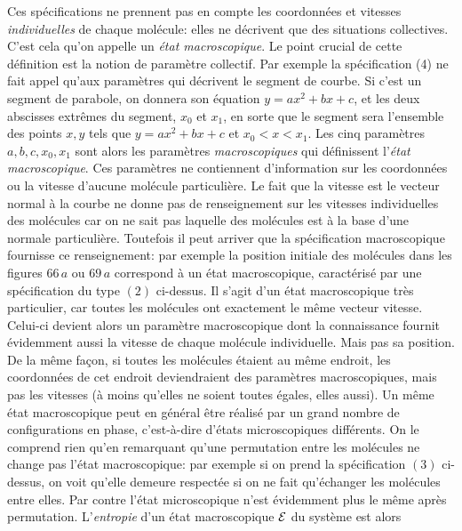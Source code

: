 Ces sp\'ecifications ne prennent pas en compte les coordonn\'ees et 
vitesses {\it individuelles} de chaque mol\'ecule: elles ne d\'ecrivent 
que des situations collectives. C'est cela qu'on appelle un {\it \'etat 
m{\bigsl a\kern0.3pt}croscopique}. Le point crucial de cette d\'efinition 
est la notion de param\`etre collectif.  Par exemple la sp\'ecification (4) 
ne fait appel qu'aux para\-m\`etres qui d\'ecrivent le segment de courbe. 
Si c'est un segment de parabole, on donnera son \'equation 
$y=ax^2 + bx + c$, et les deux abscisses extr\^emes du segment, $x_0$ 
et $x_1$, en sorte que le segment sera l'ensemble des points $x,y$ 
tels que $y=ax^2 + bx + c$ et $x_0 < x < x_1$. Les cinq param\`etres 
$a,b,c,x_0, x_1$ sont alors les param\`etres {\it macroscopiques} qui
d\'efinissent l'{\it \'etat macroscopique}. Ces param\`etres ne
contiennent d'information sur les coordonn\'ees ou la vitesse d'aucune 
mol\'ecule particuli\`ere. Le fait que la vitesse est le vecteur normal 
\`a la courbe ne donne pas de renseignement sur les vitesses individuelles 
des mol\'ecules car on ne sait pas laquelle des mol\'ecules est \`a la 
base d'une normale particuli\`ere. Toutefois il peut arriver que la 
sp\'ecification macroscopique fournisse ce renseignement: par exemple 
la position initiale des mol\'ecules dans les 
figures $66\, a$ ou $69\, a$ correspond \`a un \'etat macroscopique, 
caract\'eris\'e par une sp\'ecification du type $(2)$ ci-dessus. Il s'agit 
d'un \'etat macroscopique tr\`es particulier, car toutes les mol\'ecules ont 
exactement le m\^eme vecteur vitesse. Celui-ci devient alors un param\`etre 
macroscopique dont la connaissance fournit \'evidemment aussi la vitesse de 
chaque mol\'ecule individuelle. Mais pas sa position. De la m\^eme fa\c{c}on, 
si toutes les mol\'ecules \'etaient au m\^eme endroit, les coordonn\'ees de 
cet endroit deviendraient des param\`etres macroscopiques, mais pas les 
vitesses (\`a moins qu'elles ne soient toutes \'egales, elles aussi).
\medskip
Un m\^eme \'etat macroscopique peut en g\'en\'eral \^etre r\'ealis\'e par 
un grand nombre de configurations en phase, c'est-\`a-dire d'\'etats
microscopiques 
diff\'erents. On le comprend rien qu'en remarquant qu'une permutation 
entre les mol\'ecules ne change pas l'\'etat macroscopique: par exemple si on 
prend la sp\'ecification $(3)$ ci-dessus, on voit qu'elle demeure respect\'ee 
si on ne fait qu'\'echanger les mol\'ecules entre elles. Par contre l'\'etat 
microscopique n'est \'evidemment plus le m\^eme apr\`es permutation. 
\medskip
L'{\it entropie} d'un \'etat macroscopique ${\cal E}$ du syst\`eme est alors 
